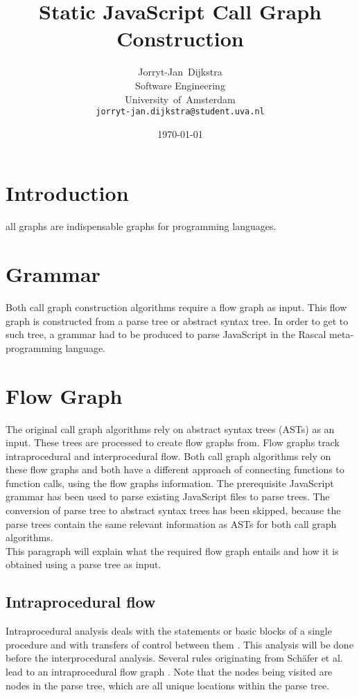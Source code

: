\documentclass[journal,10pt]{IEEEtran}
\begin{document}
\title{Static JavaScript Call Graph Construction}
\author{Jorryt-Jan~Dijkstra \\ Software Engineering \\ University~of~Amsterdam \\ \texttt{jorryt-jan.dijkstra@student.uva.nl}}
\date{\today}

\maketitle


\section{Introduction}
all graphs are indispensable graphs for programming languages.

\section{Grammar}
Both call graph construction algorithms require a flow graph as input. This flow graph is constructed from a parse tree or abstract syntax tree. In order to get to such tree, a grammar had to be produced to parse JavaScript in the Rascal meta-programming language.

\section{Flow Graph}
The original call graph algorithms rely on abstract syntax trees (ASTs) as an input. These trees are processed to create flow graphs from. Flow graphs track intraprocedural and interprocedural flow. Both call graph algorithms rely on these flow graphs and both have a different approach of connecting functions to function calls, using the flow graphs information. 
The prerequisite JavaScript grammar has been used to parse existing JavaScript files to parse trees. The conversion of parse tree to abstract syntax trees has been skipped, because the parse trees contain the same relevant information as ASTs for both call graph algorithms. \\
This paragraph will explain what the required flow graph entails and how it is obtained using a parse tree as input.

\subsection{Intraprocedural flow}
Intraprocedural analysis deals with the statements or basic blocks of a single procedure and with transfers of control between them \cite[p. 3]{Marlowe:1990aa}. This analysis will be done before the interprocedural analysis. Several rules originating from Sch\"{a}fer et al. lead to an intraprocedural flow graph \cite[p. 5]{Feldthaus:2013}. Note that the nodes being visited are nodes in the parse tree, which are all unique locations within the parse tree.
\end{document}
